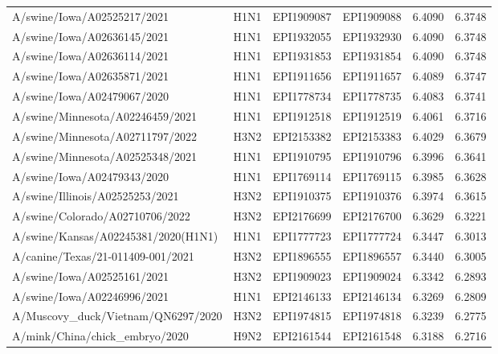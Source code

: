 \begin{tabular}{L{1.95in}|L{.25in}|L{.60in}|L{.6in}|C{1in}|C{1in}}
A/swine/Iowa/A02525217/2021&H1N1&EPI1909087&EPI1909088&6.4090&6.3748\\
A/swine/Iowa/A02636145/2021&H1N1&EPI1932055&EPI1932930&6.4090&6.3748\\
A/swine/Iowa/A02636114/2021&H1N1&EPI1931853&EPI1931854&6.4090&6.3748\\
A/swine/Iowa/A02635871/2021&H1N1&EPI1911656&EPI1911657&6.4089&6.3747\\
A/swine/Iowa/A02479067/2020&H1N1&EPI1778734&EPI1778735&6.4083&6.3741\\
A/swine/Minnesota/A02246459/2021&H1N1&EPI1912518&EPI1912519&6.4061&6.3716\\
A/swine/Minnesota/A02711797/2022&H3N2&EPI2153382&EPI2153383&6.4029&6.3679\\
A/swine/Minnesota/A02525348/2021&H1N1&EPI1910795&EPI1910796&6.3996&6.3641\\
A/swine/Iowa/A02479343/2020&H1N1&EPI1769114&EPI1769115&6.3985&6.3628\\
A/swine/Illinois/A02525253/2021&H3N2&EPI1910375&EPI1910376&6.3974&6.3615\\
A/swine/Colorado/A02710706/2022&H3N2&EPI2176699&EPI2176700&6.3629&6.3221\\
A/swine/Kansas/A02245381/2020(H1N1)&H1N1&EPI1777723&EPI1777724&6.3447&6.3013\\
A/canine/Texas/21-011409-001/2021&H3N2&EPI1896555&EPI1896557&6.3440&6.3005\\
A/swine/Iowa/A02525161/2021&H3N2&EPI1909023&EPI1909024&6.3342&6.2893\\
A/swine/Iowa/A02246996/2021&H1N1&EPI2146133&EPI2146134&6.3269&6.2809\\
A/Muscovy\_duck/Vietnam/QN6297/2020&H3N2&EPI1974815&EPI1974818&6.3239&6.2775\\
A/mink/China/chick\_embryo/2020&H9N2&EPI2161544&EPI2161548&6.3188&6.2716\\
\hline\end{tabular}

